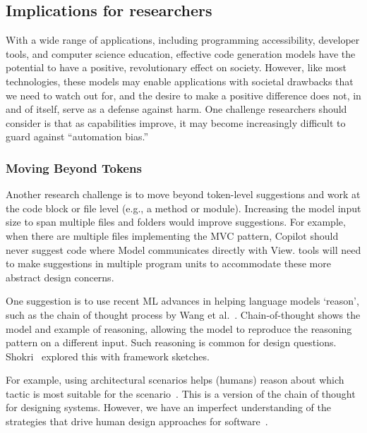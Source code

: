 

\subsection{Implications for researchers}
With a wide range of applications, including programming accessibility, developer tools, and computer science education, effective code generation models have the potential to have a positive, revolutionary effect on society. 
However, like most technologies, these models may enable applications with societal drawbacks that we need to watch out for, and the desire to make a positive difference does not, in and of itself, serve as a defense against harm.
One challenge researchers should consider is that as capabilities improve, it may become increasingly difficult to guard against “automation bias.”

\subsubsection{Moving Beyond Tokens}
Another research challenge is to move beyond token-level suggestions and work at the code block or file level (e.g., a method or module). 
Increasing the model input size to span multiple files and folders would improve suggestions. For example, when there are multiple files implementing the MVC pattern, Copilot should never suggest code where \textsf{Model} communicates directly with \textsf{View}. 
\AISE{} tools will need to make suggestions in multiple program units to accommodate these more abstract design concerns.

One suggestion is to use recent ML advances in helping language models `reason', such as the chain of thought process by Wang et al.~\cite{chain_of_thought}. 
Chain-of-thought shows the model and example of reasoning, allowing the model to reproduce the reasoning pattern on a different input.
Such reasoning is common for design questions. 
Shokri~\cite{shokri21} explored this with framework sketches.

For example, using architectural scenarios helps (humans) reason about which tactic is most suitable for the scenario~\cite{kazman98}. This is a version of the chain of thought for designing systems. 
However, we have an imperfect understanding of the strategies that drive human design approaches for software~\cite{Arab2022}. 